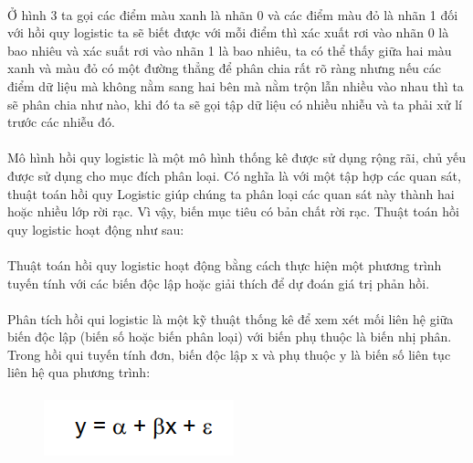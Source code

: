 \documentclass{article}
\begin{document}
\paragraph{}
Ở hình 3  ta gọi các điểm màu xanh là nhãn 0 và các điểm màu đỏ là nhãn 1 đối với hồi quy logistic ta sẽ biết được với mỗi điểm thì xác xuất rơi vào nhãn 0 là bao nhiêu và xác suất rơi vào nhãn 1 là bao nhiêu, ta có thể thấy giữa hai màu xanh và màu đỏ có một đường thẳng để phân chia rất rõ ràng nhưng nếu các điểm dữ liệu mà không nằm sang hai bên mà nằm trộn lẫn nhiều vào nhau thì ta sẽ phân chia như nào, khi đó ta sẽ gọi tập dữ liệu có nhiều nhiễu và ta phải xử lí trước các nhiễu đó.
\paragraph{}
    Mô hình hồi quy logistic là một mô hình thống kê được sử dụng rộng rãi, chủ yếu được sử dụng cho mục đích phân loại. Có nghĩa là với một tập hợp các quan sát, thuật toán hồi quy Logistic giúp chúng ta phân loại các quan sát này thành hai hoặc nhiều lớp rời rạc. Vì vậy, biến mục tiêu có bản chất rời rạc. Thuật toán hồi quy logistic hoạt động như sau:
\paragraph{}
	Thuật toán hồi quy logistic hoạt động bằng cách thực hiện một phương trình tuyến tính với các biến độc lập hoặc giải thích để dự đoán giá trị phản hồi. 
\paragraph{}
	Phân tích hồi qui logistic là một kỹ thuật thống kê để xem xét mối liên hệ giữa biến độc lập (biến số hoặc biến phân loại) với biến phụ thuộc là biến nhị phân. Trong hồi qui tuyến tính đơn, biến độc lập x và phụ thuộc y là biến số liên tục liên hệ qua phương trình:
\paragraph{}
\begin{figure}[!h]
	\begin{center}
		\includegraphics[width=\linewidth]{images/CongThuc1.png}
        \end{center}
\end{figure}
\end{document}
